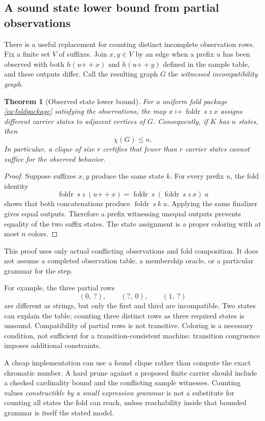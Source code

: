 \documentclass[11pt,a4paper]{article}
\newcommand{\foldr}{\operatorname{foldr}}
\newtheorem{theorem}[proposition]{Theorem}
\theoremstyle{definition}
\theoremstyle{remark}
\begin{document}
\subsection{A sound state lower bound from partial observations}
\label{sec:carrierbound}
There is a useful replacement for counting distinct incomplete observation
rows. Fix a finite set $V$ of suffixes. Join $x,y\in V$ by an edge when a prefix
$u$ has been observed with both $h(u\mathbin{++}x)$ and
$h(u\mathbin{++}y)$ defined in the sample table, and these outputs differ.
Call the resulting graph $G$ the \emph{witnessed incompatibility graph}.

\begin{theorem}[Observed state lower bound]\label{thm:statebound}
For a uniform fold package \eqref{eq:foldpackage} satisfying the observations,
the map $x\mapsto\foldr\ s\ z\ x$ assigns different carrier states to adjacent
vertices of $G$. Consequently, if $K$ has $n$ states, then
\[
 \chi(G)\leq n.
\]
In particular, a clique of size $r$ certifies that fewer than $r$ carrier states
cannot suffice for the observed behavior.
\end{theorem}
\begin{proof}
Suppose suffixes $x,y$ produce the same state $k$. For every prefix $u$, the
fold identity
\[
 \foldr\ s\ z\ (u\mathbin{++}x)
 =\foldr\ s\ (\foldr\ s\ z\ x)\ u
\]
shows that both concatenations produce $\foldr\ s\ k\ u$. Applying the same
finalizer gives equal outputs. Therefore a prefix witnessing unequal outputs
prevents equality of the two suffix states. The state assignment is a proper
coloring with at most $n$ colors.
\end{proof}
This proof uses only actual conflicting observations and fold composition. It
does not assume a completed observation table, a membership oracle, or a
particular grammar for the step.

For example, the three partial rows
\[
 (0,\ ?),\qquad (?,\ 0),\qquad (1,\ ?)
\]
are different as strings, but only the first and third are incompatible. Two
states can explain the table; counting three distinct rows as three required
states is unsound. Compatibility of partial rows is not transitive. Coloring
is a necessary condition, not sufficient for a transition-consistent machine:
transition congruence imposes additional constraints.

A cheap implementation can use a found clique rather than compute the exact
chromatic number. A hard prune against a proposed finite carrier should include
a checked cardinality bound and the conflicting sample witnesses. Counting
values \emph{constructible by a small expression grammar} is not a substitute
for counting all states the fold can reach, unless reachability inside that
bounded grammar is itself the stated model.
\end{document}
